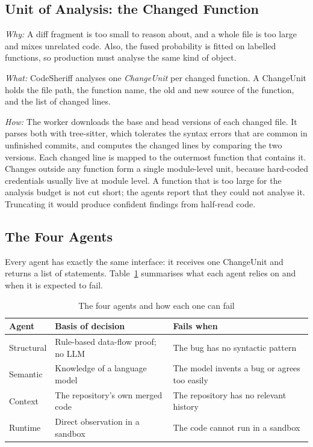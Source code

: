 \documentclass[conference]{IEEEtran}
\begin{document}
\subsection{Unit of Analysis: the Changed Function}
\label{subsec:unit}

\textit{Why:} A diff fragment is too small to reason about, and a whole
file is too large and mixes unrelated code. Also, the fused probability is
fitted on labelled functions, so production must analyse the same kind of
object.

\textit{What:} CodeSheriff analyses one \emph{ChangeUnit} per changed
function. A ChangeUnit holds the file path, the function name, the old and
new source of the function, and the list of changed lines.

\textit{How:} The worker downloads the base and head versions of each
changed file. It parses both with tree-sitter, which tolerates the syntax
errors that are common in unfinished commits, and computes the changed
lines by comparing the two versions. Each changed line is mapped to the
outermost function that contains it. Changes outside any function form a
single module-level unit, because hard-coded credentials usually live at
module level. A function that is too large for the analysis budget is not
cut short; the agents report that they could not analyse it. Truncating it
would produce confident findings from half-read code.

\subsection{The Four Agents}
\label{subsec:agents}

Every agent has exactly the same interface: it receives one ChangeUnit and
returns a list of statements. Table~\ref{tab:agents} summarises what each
agent relies on and when it is expected to fail.

\begin{table}[t]
\centering
\caption{The four agents and how each one can fail}
\label{tab:agents}
\small
\setlength{\tabcolsep}{3pt}
\begin{tabular}{p{1.5cm}p{3.0cm}p{3.0cm}}
\toprule
Agent & Basis of decision & Fails when \\
\midrule
Structural & Rule-based data-flow proof; no LLM & The bug has no syntactic pattern \\
Semantic   & Knowledge of a language model & The model invents a bug or agrees too easily \\
Context    & The repository's own merged code & The repository has no relevant history \\
Runtime    & Direct observation in a sandbox & The code cannot run in a sandbox \\
\bottomrule
\end{tabular}
\end{table}
\end{document}
